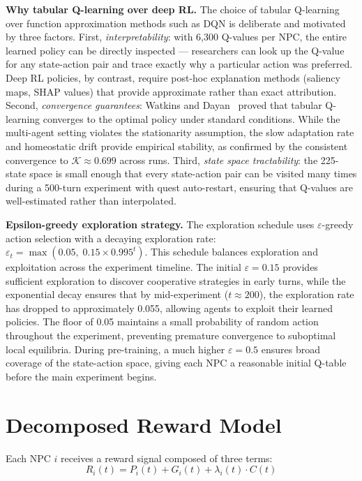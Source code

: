 \documentclass[12pt, a4paper, oneside]{report}
\begin{document}
\textbf{Why tabular Q-learning over deep RL.}
The choice of tabular Q-learning over function approximation methods such as DQN is deliberate and motivated by three factors. First, \emph{interpretability}: with 6,300 Q-values per NPC, the entire learned policy can be directly inspected --- researchers can look up the Q-value for any state-action pair and trace exactly why a particular action was preferred. Deep RL policies, by contrast, require post-hoc explanation methods (saliency maps, SHAP values) that provide approximate rather than exact attribution. Second, \emph{convergence guarantees}: Watkins and Dayan~\cite{watkins1992qlearning} proved that tabular Q-learning converges to the optimal policy under standard conditions. While the multi-agent setting violates the stationarity assumption, the slow adaptation rate and homeostatic drift provide empirical stability, as confirmed by the consistent convergence to $\mathcal{K} \approx 0.699$ across runs. Third, \emph{state space tractability}: the 225-state space is small enough that every state-action pair can be visited many times during a 500-turn experiment with quest auto-restart, ensuring that Q-values are well-estimated rather than interpolated.

\textbf{Epsilon-greedy exploration strategy.}
The exploration schedule uses $\varepsilon$-greedy action selection with a decaying exploration rate: $\varepsilon_t = \max(0.05,\; 0.15 \times 0.995^t)$. This schedule balances exploration and exploitation across the experiment timeline. The initial $\varepsilon = 0.15$ provides sufficient exploration to discover cooperative strategies in early turns, while the exponential decay ensures that by mid-experiment ($t \approx 200$), the exploration rate has dropped to approximately 0.055, allowing agents to exploit their learned policies. The floor of 0.05 maintains a small probability of random action throughout the experiment, preventing premature convergence to suboptimal local equilibria. During pre-training, a much higher $\varepsilon = 0.5$ ensures broad coverage of the state-action space, giving each NPC a reasonable initial Q-table before the main experiment begins.

\section{Decomposed Reward Model}
\label{sec:reward-model}

Each NPC $i$ receives a reward signal composed of three terms:
\begin{equation}
    R_i(t) = P_i(t) + G_i(t) + \lambda_i(t) \cdot C(t)
    \label{eq:reward}
\end{equation}
\end{document}

